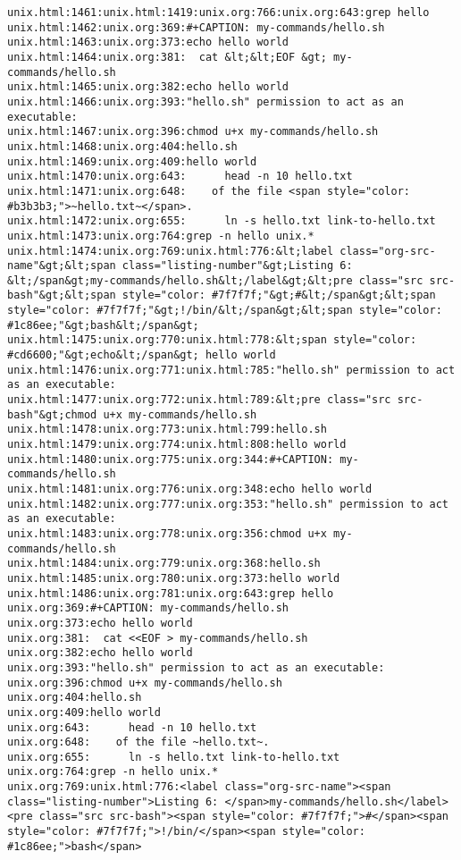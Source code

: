 \documentclass[11pt]{article}
\begin{document}
\begin{verbatim}
unix.html:1461:unix.html:1419:unix.org:766:unix.org:643:grep hello 
unix.html:1462:unix.org:369:#+CAPTION: my-commands/hello.sh
unix.html:1463:unix.org:373:echo hello world
unix.html:1464:unix.org:381:  cat &lt;&lt;EOF &gt; my-commands/hello.sh
unix.html:1465:unix.org:382:echo hello world
unix.html:1466:unix.org:393:"hello.sh" permission to act as an executable:
unix.html:1467:unix.org:396:chmod u+x my-commands/hello.sh
unix.html:1468:unix.org:404:hello.sh
unix.html:1469:unix.org:409:hello world
unix.html:1470:unix.org:643:      head -n 10 hello.txt
unix.html:1471:unix.org:648:    of the file <span style="color: #b3b3b3;">~hello.txt~</span>.
unix.html:1472:unix.org:655:      ln -s hello.txt link-to-hello.txt
unix.html:1473:unix.org:764:grep -n hello unix.*
unix.html:1474:unix.org:769:unix.html:776:&lt;label class="org-src-name"&gt;&lt;span class="listing-number"&gt;Listing 6: &lt;/span&gt;my-commands/hello.sh&lt;/label&gt;&lt;pre class="src src-bash"&gt;&lt;span style="color: #7f7f7f;"&gt;#&lt;/span&gt;&lt;span style="color: #7f7f7f;"&gt;!/bin/&lt;/span&gt;&lt;span style="color: #1c86ee;"&gt;bash&lt;/span&gt;
unix.html:1475:unix.org:770:unix.html:778:&lt;span style="color: #cd6600;"&gt;echo&lt;/span&gt; hello world
unix.html:1476:unix.org:771:unix.html:785:"hello.sh" permission to act as an executable:
unix.html:1477:unix.org:772:unix.html:789:&lt;pre class="src src-bash"&gt;chmod u+x my-commands/hello.sh
unix.html:1478:unix.org:773:unix.html:799:hello.sh
unix.html:1479:unix.org:774:unix.html:808:hello world
unix.html:1480:unix.org:775:unix.org:344:#+CAPTION: my-commands/hello.sh
unix.html:1481:unix.org:776:unix.org:348:echo hello world
unix.html:1482:unix.org:777:unix.org:353:"hello.sh" permission to act as an executable:
unix.html:1483:unix.org:778:unix.org:356:chmod u+x my-commands/hello.sh
unix.html:1484:unix.org:779:unix.org:368:hello.sh
unix.html:1485:unix.org:780:unix.org:373:hello world
unix.html:1486:unix.org:781:unix.org:643:grep hello 
unix.org:369:#+CAPTION: my-commands/hello.sh
unix.org:373:echo hello world
unix.org:381:  cat <<EOF > my-commands/hello.sh
unix.org:382:echo hello world
unix.org:393:"hello.sh" permission to act as an executable:
unix.org:396:chmod u+x my-commands/hello.sh
unix.org:404:hello.sh
unix.org:409:hello world
unix.org:643:      head -n 10 hello.txt
unix.org:648:    of the file ~hello.txt~.
unix.org:655:      ln -s hello.txt link-to-hello.txt
unix.org:764:grep -n hello unix.*
unix.org:769:unix.html:776:<label class="org-src-name"><span class="listing-number">Listing 6: </span>my-commands/hello.sh</label><pre class="src src-bash"><span style="color: #7f7f7f;">#</span><span style="color: #7f7f7f;">!/bin/</span><span style="color: #1c86ee;">bash</span>

\end{verbatim}
\end{document}

